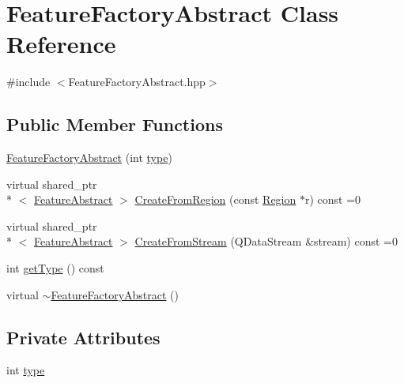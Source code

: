 \hypertarget{class_feature_factory_abstract}{\section{Feature\+Factory\+Abstract Class Reference}
\label{class_feature_factory_abstract}
}


{\ttfamily \#include $<$Feature\+Factory\+Abstract.\+hpp$>$}

\subsection*{Public Member Functions}
\begin{DoxyCompactItemize}
\item 
\hyperlink{class_feature_factory_abstract_ad4b115dcdef61da4220ddfeef13f098f}{Feature\+Factory\+Abstract} (int \hyperlink{class_feature_factory_abstract_acdc4ca5ce9d35423f420c53081f0f238}{type})
\item 
virtual shared\+\_\+ptr\\*
$<$ \hyperlink{class_feature_abstract}{Feature\+Abstract} $>$ \hyperlink{class_feature_factory_abstract_a62446de90f18d896ff650871d94bf9b7}{Create\+From\+Region} (const \hyperlink{class_region}{Region} $\ast$r) const =0
\item 
virtual shared\+\_\+ptr\\*
$<$ \hyperlink{class_feature_abstract}{Feature\+Abstract} $>$ \hyperlink{class_feature_factory_abstract_aa71cd5e5cadad3945fd7a1561d28bd52}{Create\+From\+Stream} (Q\+Data\+Stream \&stream) const =0
\item 
int \hyperlink{class_feature_factory_abstract_ab8d13b663824c6e49c8d195344b934a3}{get\+Type} () const 
\item 
virtual \hyperlink{class_feature_factory_abstract_af219e0ee978f0d7bf87761471a1ff96d}{$\sim$\+Feature\+Factory\+Abstract} ()
\end{DoxyCompactItemize}
\subsection*{Private Attributes}
\begin{DoxyCompactItemize}
\item 
int \hyperlink{class_feature_factory_abstract_acdc4ca5ce9d35423f420c53081f0f238}{type}
\end{DoxyCompactItemize}



